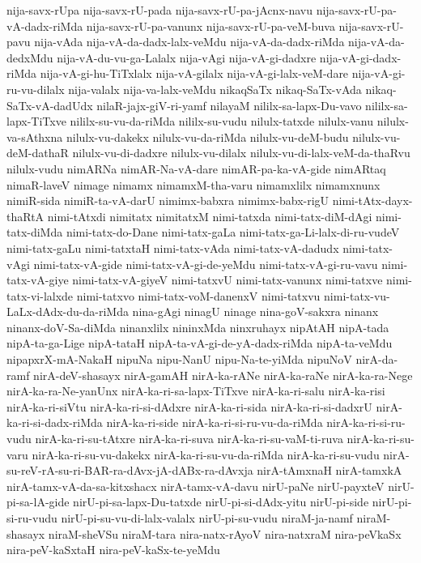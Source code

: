 {nija-savx-rUpa
nija-savx-rU-pada
nija-savx-rU-pa-jAcnx-navu
nija-savx-rU-pa-vA-dadx-riMda
nija-savx-rU-pa-vanunx
nija-savx-rU-pa-veM-buva
nija-savx-rU-pavu
nija-vAda
nija-vA-da-dadx-lalx-veMdu
nija-vA-da-dadx-riMda
nija-vA-da-dedxMdu
nija-vA-du-vu-ga-Lalalx
nija-vAgi
nija-vA-gi-dadxre
nija-vA-gi-dadx-riMda
nija-vA-gi-hu-TiTxlalx
nija-vA-gilalx
nija-vA-gi-lalx-veM-dare
nija-vA-gi-ru-vu-dilalx
nija-valalx
nija-va-lalx-veMdu
nikaqSaTx
nikaq-SaTx-vAda
nikaq-SaTx-vA-dadUdx
nilaR-jajx-giV-ri-yamf
nilayaM
nililx-sa-lapx-Du-vavo
nililx-sa-lapx-TiTxve
nililx-su-vu-da-riMda
nililx-su-vudu
nilulx-tatxde
nilulx-vanu
nilulx-va-sAthxna
nilulx-vu-dakekx
nilulx-vu-da-riMda
nilulx-vu-deM-budu
nilulx-vu-deM-dathaR
nilulx-vu-di-dadxre
nilulx-vu-dilalx
nilulx-vu-di-lalx-veM-da-thaRvu
nilulx-vudu
nimARNa
nimAR-Na-vA-dare
nimAR-pa-ka-vA-gide
nimARtaq
nimaR-laveV
nimage
nimamx
nimamxM-tha-varu
nimamxlilx
nimamxnunx
nimiR-sida
nimiR-ta-vA-darU
nimimx-babxra
nimimx-babx-rigU
nimi-tAtx-dayx-thaRtA
nimi-tAtxdi
nimitatx
nimitatxM
nimi-tatxda
nimi-tatx-diM-dAgi
nimi-tatx-diMda
nimi-tatx-do-Dane
nimi-tatx-gaLa
nimi-tatx-ga-Li-lalx-di-ru-vudeV
nimi-tatx-gaLu
nimi-tatxtaH
nimi-tatx-vAda
nimi-tatx-vA-dadudx
nimi-tatx-vAgi
nimi-tatx-vA-gide
nimi-tatx-vA-gi-de-yeMdu
nimi-tatx-vA-gi-ru-vavu
nimi-tatx-vA-giye
nimi-tatx-vA-giyeV
nimi-tatxvU
nimi-tatx-vanunx
nimi-tatxve
nimi-tatx-vi-lalxde
nimi-tatxvo
nimi-tatx-voM-danenxV
nimi-tatxvu
nimi-tatx-vu-LaLx-dAdx-du-da-riMda
nina-gAgi
ninagU
ninage
nina-goV-sakxra
ninanx
ninanx-doV-Sa-diMda
ninanxlilx
nininxMda
ninxruhayx
nipAtAH
nipA-tada
nipA-ta-ga-Lige
nipA-tataH
nipA-ta-vA-gi-de-yA-dadx-riMda
nipA-ta-veMdu
nipapxrX-mA-NakaH
nipuNa
nipu-NanU
nipu-Na-te-yiMda
nipuNoV
nirA-da-ramf
nirA-deV-shasayx
nirA-gamAH
nirA-ka-rANe
nirA-ka-raNe
nirA-ka-ra-Nege
nirA-ka-ra-Ne-yanUnx
nirA-ka-ri-sa-lapx-TiTxve
nirA-ka-ri-salu
nirA-ka-risi
nirA-ka-ri-siVtu
nirA-ka-ri-si-dAdxre
nirA-ka-ri-sida
nirA-ka-ri-si-dadxrU
nirA-ka-ri-si-dadx-riMda
nirA-ka-ri-side
nirA-ka-ri-si-ru-vu-da-riMda
nirA-ka-ri-si-ru-vudu
nirA-ka-ri-su-tAtxre
nirA-ka-ri-suva
nirA-ka-ri-su-vaM-ti-ruva
nirA-ka-ri-su-varu
nirA-ka-ri-su-vu-dakekx
nirA-ka-ri-su-vu-da-riMda
nirA-ka-ri-su-vudu
nirA-su-reV-rA-su-ri-BAR-ra-dAvx-jA-dABx-ra-dAvxja
nirA-tAmxnaH
nirA-tamxkA
nirA-tamx-vA-da-sa-kitxshacx
nirA-tamx-vA-davu
nirU-paNe
nirU-payxteV
nirU-pi-sa-lA-gide
nirU-pi-sa-lapx-Du-tatxde
nirU-pi-si-dAdx-yitu
nirU-pi-side
nirU-pi-si-ru-vudu
nirU-pi-su-vu-di-lalx-valalx
nirU-pi-su-vudu
niraM-ja-namf
niraM-shasayx
niraM-sheVSu
niraM-tara
nira-natx-rAyoV
nira-natxraM
nira-peVkaSx
nira-peV-kaSxtaH
nira-peV-kaSx-te-yeMdu
}
